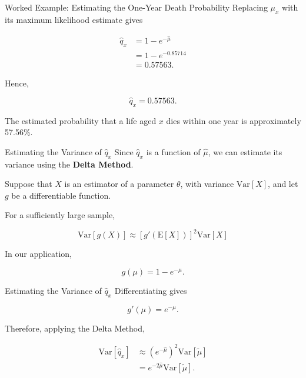 \documentclass[
  ignorenonframetext,
  aspectratio=169,
]{beamer}
\begin{document}
\begin{frame}{Worked Example: Estimating the One-Year Death Probability}
\protect{}\label{worked-example-estimating-the-one-year-death-probability-1}
Replacing \(\mu_x\) with its maximum likelihood estimate gives

\[
\begin{aligned}
\hat{q}_x
&=1-e^{-\hat{\mu}}\\
&=1-e^{-0.85714}\\
&=0.57563.
\end{aligned}
\]

Hence,

\[
\boxed{\hat{q}_x=0.57563.}
\]

The estimated probability that a life aged \(x\) dies within one year is
approximately 57.56\%.
\end{frame}

\begin{frame}{Estimating the Variance of \(\hat{q}_x\)}
\protect{}\label{estimating-the-variance-of-hatq_x}
Since \(\hat{q}_x\) is a function of \(\hat{\mu}\), we can estimate its
variance using the \textbf{Delta Method}.

Suppose that \(X\) is an estimator of a parameter \(\theta\), with
variance \(\mathrm{Var}[X]\), and let \(g\) be a differentiable
function.

For a sufficiently large sample,

\[
\boxed{
\mathrm{Var}[g(X)]
\approx
[g'(\mathrm{E}[X])]^2\mathrm{Var}[X]
}
\]

In our application,

\[
g(\mu)=1-e^{-\mu}.
\]
\end{frame}

\begin{frame}{Estimating the Variance of \(\hat{q}_x\)}
\protect{}\label{estimating-the-variance-of-hatq_x-1}
Differentiating gives

\[
g'(\mu)=e^{-\mu}.
\]

Therefore, applying the Delta Method,

\[
\begin{aligned}
\mathrm{Var}[\hat{q}_x]
&\approx
\left(e^{-\hat{\mu}}\right)^2
\mathrm{Var}[\tilde{\mu}]\\
&=e^{-2\hat{\mu}}
\mathrm{Var}[\tilde{\mu}].
\end{aligned}
\]
\end{frame}
\end{document}
